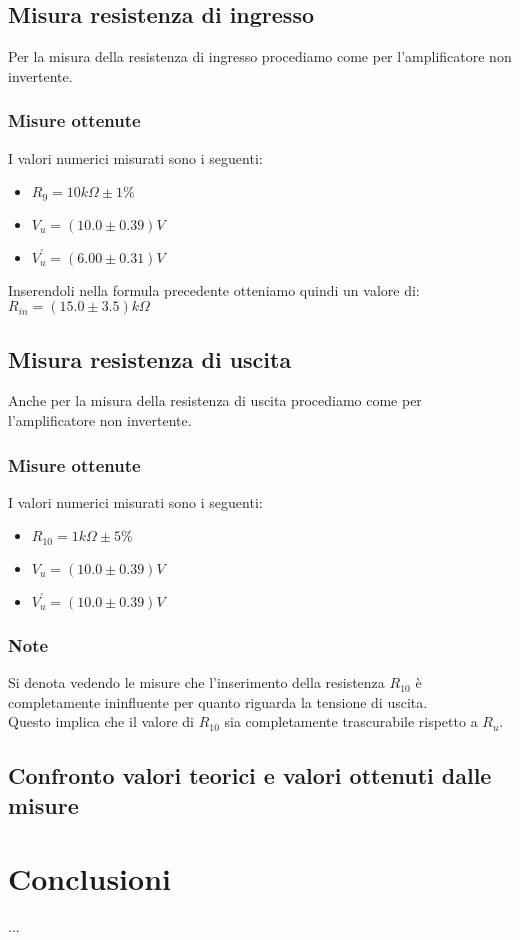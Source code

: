 \documentclass{article}
\begin{document}
\subsection{Misura resistenza di ingresso}
Per la misura della resistenza di ingresso procediamo come per l'amplificatore non invertente.
\subsubsection{Misure ottenute}
I valori numerici misurati sono i seguenti:
\begin{itemize}
    \item \large $R_{9} = 10k\Omega \pm 1\%$
    \item \large $V_{u} = (10.0 \pm 0.39)V$
    \item \large $V_{u}^{'} = (6.00 \pm 0.31)V$
\end{itemize}
Inserendoli nella formula precedente otteniamo quindi un valore di: \\ \large $R_{in} = (15.0 \pm 3.5)k\Omega$
\subsection{Misura resistenza di uscita}
Anche per la misura della resistenza di uscita procediamo come per l'amplificatore non invertente.
\subsubsection{Misure ottenute}
I valori numerici misurati sono i seguenti:
\begin{itemize}
    \item \large $R_{10} = 1k\Omega \pm 5\%$
    \item \large $V_{u} = (10.0 \pm 0.39)V$
    \item \large $V_{u}^{'} = (10.0 \pm 0.39)V$
\end{itemize}
\subsubsection{Note}
Si denota vedendo le misure che l'inserimento della resistenza $R_{10}$ è completamente ininfluente per quanto riguarda la tensione di uscita.\\Questo implica che il valore di $R_{10}$ sia completamente trascurabile rispetto a $R_{u}$.
\subsection{Confronto valori teorici e valori ottenuti dalle misure}

\section{Conclusioni}
...
\end{document}
